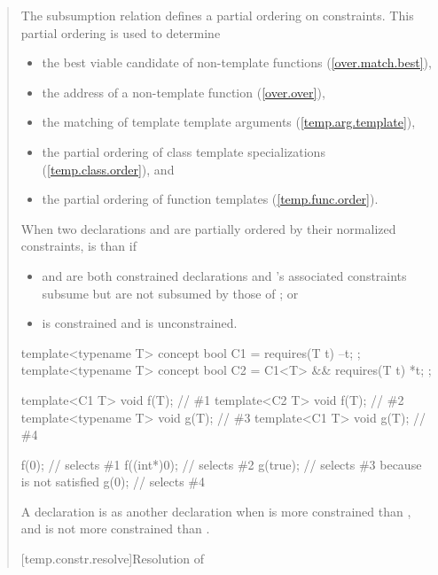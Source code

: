 \begin{quote}
\pnum
The subsumption relation defines a partial ordering on constraints. 
This partial ordering is used to determine
% 
\begin{itemize}
\item the best viable candidate of non-template functions
     (\ref{over.match.best}), 
\item the address of a non-template function
     (\ref{over.over}), 
\item the matching of template template arguments
     (\ref{temp.arg.template}), 
\item the partial ordering of class template specializations
     (\ref{temp.class.order}), and
\item the partial ordering of function templates
     (\ref{temp.func.order}).
\end{itemize}

\pnum
When two declarations  and  are
partially ordered by their normalized constraints,  is 
 than  if
% 
\begin{itemize}
\item {} and  are both constrained
declarations and 's associated constraints subsume but 
are not subsumed by those of ; or

\item {} is constrained and  is
unconstrained. 
\end{itemize}
% 
\enterexample
\begin{codeblock}
template<typename T> concept bool C1 = requires(T t) { --t; };
template<typename T> concept bool C2 = C1<T> && requires(T t) { *t; };

template<C1 T> void f(T);       // \#1
template<C2 T> void f(T);       // \#2
template<typename T> void g(T); // \#3
template<C1 T> void g(T);       // \#4

f(0);       // selects \#1
f((int*)0); // selects \#2
g(true);    // selects \#3 because  is not satisfied
g(0);       // selects \#4
\end{codeblock}
\exitexample

\pnum
A declaration  is 
as another declaration  when  is more
constrained than , and  is not more
constrained than .


[temp.constr.resolve]{Resolution of }


\end{quote}
